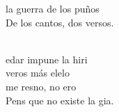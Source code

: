 \begin{cancion}
	 la guerra de los puños \\
	De los cantos, dos versos.\\\jump\\
	\begin{chorus}%
	edar impune la hiri\\
	 veros más elelo\\
	 me resno, no ero \\
	Pens que no existe la gia. \\
	\end{chorus}%
	\jump\\
\end{cancion}%
